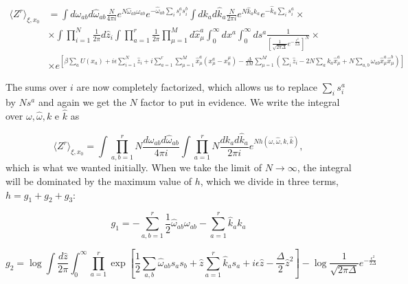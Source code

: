 \begin{align}
  \label{eq:a_33}
 \langle Z^r \rangle_{\xi, x_0} & =  \int d\omega_{ab}
  d\hat{\omega}_{ab} \frac{N}{4\pi i} e^{N \hat{\omega}_{ab}
    \omega_{ab}} e^{ - \hat{\omega}_{ab}\sum_i
      s_i^a s_i^b} \int dk_{a}
  d\hat{k}_{a} \frac{N}{2\pi i} e^{N \hat{k}_{a}
    k_{a}} e^{ - \hat{k}_{a}\sum_i
      s_i^a} \times \nonumber \\ 
    &\times \int \prod_{i=1}^N 
  \frac{1}{2\pi} d\hat{z}_i \int \prod_{a=1}^r
  \frac{1}{2\pi} \prod_{\mu=1}^M d\hat{x}_\mu^a \int_0^{\infty} d x^a
  \int_0^\infty ds^a \frac{1}{\left[\frac{1}{\sqrt{2\pi\Delta}}
      e^{-\frac{\epsilon^2}{2\Delta}}\right]^N}  \times \\ 
  & \times e^{\left[\beta \sum_a U(x_a) + i\epsilon\sum_{i=1}^N \hat{z}_i + i\sum_{a=1}^r \sum_{\mu=1}^M
    \hat{x}_\mu^a \left(x_\mu^a - x_0^\mu\right) -
    \frac{\Delta}{2M} \sum_{\mu=1}^M \left(\sum_i \hat{z}_i - 2N\sum_a
      k_a \hat{x}^a_\mu + N \sum_{a,b} \omega_{ab}\hat{x}_\mu^a
      \hat{x}_\mu^b\right)\right]} \nonumber
\end{align}

The sums over $i$ are now completely factorized, which allows us to replace $\sum_i s_i^a$ by $N s^a$ and again we get the $N$ factor to put in evidence. We write the integral over $\omega, \hat{\omega}, k$ e $\hat{k}$ as

\begin{equation}
  \label{eq:a_38}
  \langle Z^r \rangle_{\xi, x_0} = \int\prod_{a,b=1}^r N
  \frac{d\omega_{ab} d\hat{\omega}_{ab}}{4\pi i} \int \prod_{a=1}^r N
  \frac{dk_{a} d\hat{k}_{a}}{2\pi i} e^{N h(\omega, \hat{\omega}, k, \hat{k})},
\end{equation}
which is what we wanted initially. When we take the limit of $N\to\infty$, the integral will be dominated by the maximum value of $h$, which we divide in three terms, $h = g_1 + g_2 + g_3$:

\begin{equation}
  \label{eq:a_40}
  g_1 = -\sum_{a,b=1}^r  \frac{1}{2} \hat{\omega}_{ab} \omega_{ab} - \sum_{a=1}^r
  \hat{k}_a k_a 
\end{equation}

\begin{equation}
  \label{eq:a_41}
  g_2 = \log \int \frac{d\hat{z}}{2\pi} \int_0^\infty \prod_{a=1}^r
  \exp \left[ \frac{1}{2} \sum_{a,b} \hat{\omega}_{ab} s_a s_b +
    \hat{z} \sum_{a=1}^r \hat{k}_a s_a + i\epsilon \hat{z} -
    \frac{\Delta}{2} \hat{z}^2\right] - \log \frac{1}{\sqrt{2\pi\Delta}}
      e^{-\frac{\epsilon^2}{2\Delta}}
\end{equation}

